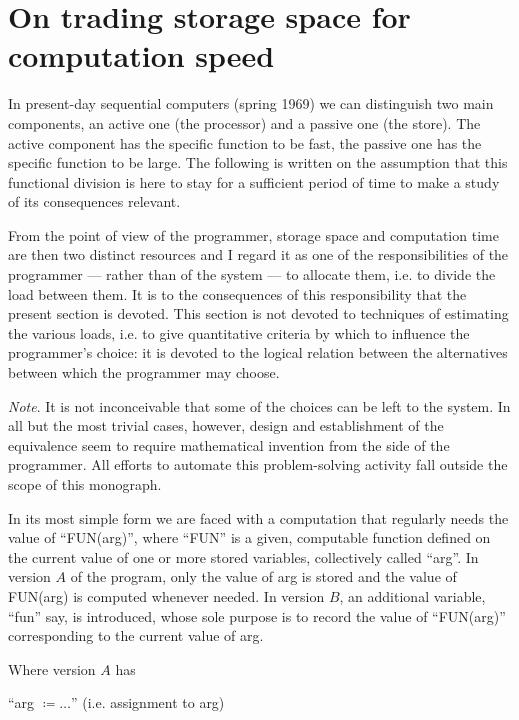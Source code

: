 \section{On trading storage space for computation speed}

In present-day sequential computers (spring 1969) we can distinguish two main components, an active one (the processor) and a passive one (the store). The active component has the specific function to be fast, the passive one has the specific function to be large. The following is written on the assumption that this functional division is here to stay for a sufficient period of time to make a study of its consequences relevant.

From the point of view of the programmer, storage space and computation time are then two distinct resources and I regard it as one of the responsibilities of the programmer --- rather than of the system --- to allocate them, i.e. to divide the load between them. It is to the consequences of this responsibility that the present section is devoted. This section is not devoted to techniques of estimating the various loads, i.e. to give quantitative criteria by which to influence the programmer's choice: it is devoted to the logical relation between the alternatives between which the programmer may choose.

\noindent
\textit{Note}. It is not inconceivable that some of the choices can be left to the system. In all but the most trivial cases, however, design and establishment of the equivalence seem to require mathematical invention from the side of the programmer. All efforts to automate this problem-solving activity fall outside the scope of this monograph.

In its most simple form we are faced with a computation that regularly needs the value of ``FUN(arg)'', where ``FUN'' is a given, computable function defined on the current value of one or more stored variables, collectively called ``arg''. In version $A$ of the program, only the value of arg is stored and the value of FUN(arg) is computed whenever needed. In version $B$, an additional variable, ``fun'' say, is introduced, whose sole purpose is to record the value of ``FUN(arg)'' corresponding to the current value of arg.

Where version $A$ has
\medskip

{
	\setlength{\parindent}{8em}
	\hspace{-.5em}``arg $\coloneq \dots$'' (i.e. assignment to arg)
	
}
\medskip

